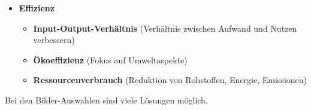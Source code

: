 \begin{myexercise}
\begin{myanswer}
\begin{itemize}
            \item \textbf{Effizienz}
                  \begin{itemize}
                      \item \textbf{Input-Output-Verhältnis} (Verhältnis zwischen Aufwand und Nutzen verbessern)
                      \item \textbf{Ökoeffizienz} (Fokus auf Umweltaspekte)
                      \item \textbf{Ressourcenverbrauch} (Reduktion von Rohstoffen, Energie, Emissionen)
                  \end{itemize}
        \end{itemize}
        Bei den Bilder-Auswahlen sind viele Lösungen möglich.
    \end{myanswer}

\end{myexercise}

